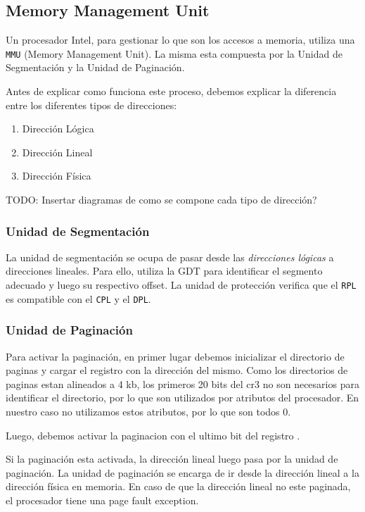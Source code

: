 \subsection{Memory Management Unit}
Un procesador Intel, para gestionar lo que son los accesos a memoria, utiliza una \texttt{MMU} (Memory Management Unit). La misma esta compuesta por la Unidad de Segmentación y la Unidad de Paginación.

Antes de explicar como funciona este proceso, debemos explicar la diferencia entre los diferentes tipos de direcciones:

\begin{enumerate}
\item Dirección Lógica
\item Dirección Lineal
\item Dirección Física
\end{enumerate}

TODO: Insertar diagramas de como se compone cada tipo de dirección?

\subsubsection{Unidad de Segmentación}

La unidad de segmentación se ocupa de pasar desde las \textit{direcciones lógicas} a direcciones lineales. Para ello, utiliza la GDT para identificar el segmento adecuado y luego su respectivo offset. La unidad de protección verifica que el \texttt{RPL} es compatible con el \texttt{CPL} y el \texttt{DPL}.

\subsubsection{Unidad de Paginación}

Para activar la paginación, en primer lugar debemos inicializar el directorio de paginas y cargar el registro  con la dirección del mismo. Como los directorios de paginas estan alineados a 4 kb, los primeros 20 bits del cr3 no son necesarios para identificar el directorio, por lo que son utilizados por atributos del procesador. En nuestro caso no utilizamos estos atributos, por lo que son todos 0.

Luego, debemos activar la paginacion con el ultimo bit del registro .

Si la paginación esta activada, la dirección lineal luego pasa por la unidad de paginación. La unidad de paginación se encarga de ir desde la dirección lineal a la dirección física en memoria. En caso de que la dirección lineal no este paginada, el procesador tiene una page fault exception.

